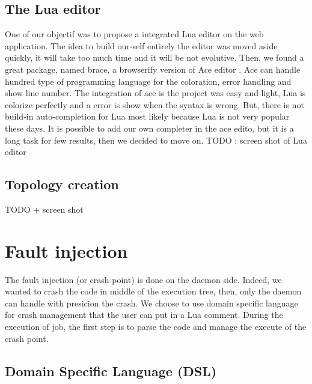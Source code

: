 \documentclass{eplmastersthesis}
\begin{document}
        \subsection{The Lua editor}
          One of our objectif was to propose a integrated Lua editor on the web application.
          The idea to build our-self entirely the editor was moved aside quickly,
          it will take too much time and it will be not evolutive. Then, we found a
          great package, named brace, a browserify version of Ace editor \cite{Ace}. Ace
          can handle hundred type of programming language for the coloration, error handling and
          show line number. The integration of ace is the project was easy and light, Lua is
          colorize perfectly and a error is show when the syntax is wrong. But, there is not
          build-in auto-completion for Lua most likely because Lua is not very popular these days.
          It is possible to add our own completer in the ace edito, but it is a long task
          for few results, then we decided to move on.
          {\color{red} TODO : screen shot of Lua editor}

      \subsection{Topology creation}
        {\color{red} TODO + screen shot}

      \section{Fault injection}

        The fault injection (or crash point) is done on the daemon side. Indeed, we wanted
        to crash the code in middle of the execution tree, then, only the daemon can
        handle with presicion the crash. We choose to use domain specific language for
        crash management that the user can put in a Lua comment. During the execution of job, the first step
        is to parse the code and manage the execute of the crash point.

        \subsection{Domain Specific Language (DSL)}
\end{document}
